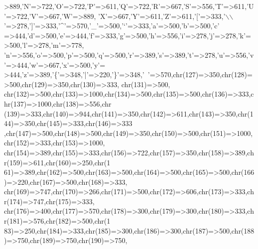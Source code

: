 \begin{DoxyCode}
{      >889,\textcolor{charliteral}{'N'}=>722,\textcolor{charliteral}{'O'}=>722,\textcolor{charliteral}{'P'}=>611,\textcolor{charliteral}{'Q'}=>722,\textcolor{charliteral}{'R'}=>667,\textcolor{charliteral}{'S'}=>556,\textcolor{charliteral}{'T'}=>611,\textcolor{charliteral}{'U'}=>722,\textcolor{charliteral}{'V'}=>667,\textcolor{charliteral}{'W'}=>889,
    \textcolor{charliteral}{'X'}=>667,\textcolor{charliteral}{'Y'}=>611,\textcolor{charliteral}{'Z'}=>611,\textcolor{charliteral}{'['}=>333,\textcolor{charliteral}{'\(\backslash\)\(\backslash\)'}=>278,\textcolor{charliteral}{']'}=>333,\textcolor{charliteral}{'^'}=>570,\textcolor{charliteral}{'\_'}=>500,\textcolor{charliteral}{'`'}=>333,\textcolor{charliteral}{'a'}=>500,\textcolor{charliteral}{'b'}=>500,\textcolor{charliteral}{'c'}
      =>444,\textcolor{charliteral}{'d'}=>500,\textcolor{charliteral}{'e'}=>444,\textcolor{charliteral}{'f'}=>333,\textcolor{charliteral}{'g'}=>500,\textcolor{charliteral}{'h'}=>556,\textcolor{charliteral}{'i'}=>278,\textcolor{charliteral}{'j'}=>278,\textcolor{charliteral}{'k'}=>500,\textcolor{charliteral}{'l'}=>278,\textcolor{charliteral}{'m'}=>778,
    \textcolor{charliteral}{'n'}=>556,\textcolor{charliteral}{'o'}=>500,\textcolor{charliteral}{'p'}=>500,\textcolor{charliteral}{'q'}=>500,\textcolor{charliteral}{'r'}=>389,\textcolor{charliteral}{'s'}=>389,\textcolor{charliteral}{'t'}=>278,\textcolor{charliteral}{'u'}=>556,\textcolor{charliteral}{'v'}=>444,\textcolor{charliteral}{'w'}=>667,\textcolor{charliteral}{'x'}=>500,\textcolor{charliteral}{'y'}=
      >444,\textcolor{charliteral}{'z'}=>389,\textcolor{charliteral}{'\{'}=>348,\textcolor{charliteral}{'|'}=>220,\textcolor{charliteral}{'\}'}=>348,\textcolor{charliteral}{'~'}=>570,chr(127)=>350,chr(128)=>500,chr(129)=>350,chr(130)=>333,
      chr(131)=>500,
    chr(132)=>500,chr(133)=>1000,chr(134)=>500,chr(135)=>500,chr(136)=>333,chr(137)=>1000,chr(138)=>556,chr
      (139)=>333,chr(140)=>944,chr(141)=>350,chr(142)=>611,chr(143)=>350,chr(144)=>350,chr(145)=>333,chr(146)=>333
      ,chr(147)=>500,chr(148)=>500,chr(149)=>350,chr(150)=>500,chr(151)=>1000,chr(152)=>333,chr(153)=>1000,
    chr(154)=>389,chr(155)=>333,chr(156)=>722,chr(157)=>350,chr(158)=>389,chr(159)=>611,chr(160)=>250,chr(1
      61)=>389,chr(162)=>500,chr(163)=>500,chr(164)=>500,chr(165)=>500,chr(166)=>220,chr(167)=>500,chr(168)=>333,
      chr(169)=>747,chr(170)=>266,chr(171)=>500,chr(172)=>606,chr(173)=>333,chr(174)=>747,chr(175)=>333,
    chr(176)=>400,chr(177)=>570,chr(178)=>300,chr(179)=>300,chr(180)=>333,chr(181)=>576,chr(182)=>500,chr(1
      83)=>250,chr(184)=>333,chr(185)=>300,chr(186)=>300,chr(187)=>500,chr(188)=>750,chr(189)=>750,chr(190)=>750,
}
\end{DoxyCode}
